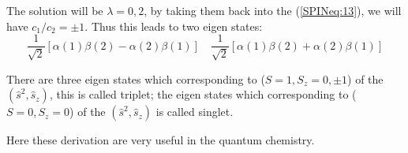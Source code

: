 The solution will be $\lambda =0, 2$, by taking them back into the
(\ref{SPINeq:13}), we will have $c_{1}/c_{2} = \pm 1$. Thus this
leads to two eigen states:
\begin{equation}\label{}
\frac{1}{\sqrt{2}}[\alpha(1)\beta(2) - \alpha(2)\beta(1)] \quad
\frac{1}{\sqrt{2}}[\alpha(1)\beta(2) + \alpha(2)\beta(1)]
\end{equation}

There are three eigen states which corresponding to ($S=1, S_{z} =0,
\pm 1$) of the $(\hat{s}^{2}, \hat{s}_{z})$, this is called triplet;
the eigen states which corresponding to ($S=0, S_{z} =0$) of the
$(\hat{s}^{2}, \hat{s}_{z})$ is called singlet.

Here these derivation are very useful in the quantum chemistry.



